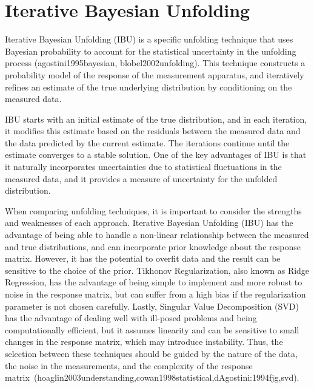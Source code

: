 \clearpage
\section{Iterative Bayesian Unfolding}
    
    Iterative Bayesian Unfolding (IBU) is a specific unfolding technique that uses Bayesian probability to account for the statistical uncertainty in the unfolding process (agostini1995bayesian, blobel2002unfolding). This technique constructs a probability model of the response of the measurement apparatus, and iteratively refines an estimate of the true underlying distribution by conditioning on the measured data.
    
    IBU starts with an initial estimate of the true distribution, and in each iteration, it modifies this estimate based on the residuals between the measured data and the data predicted by the current estimate. The iterations continue until the estimate converges to a stable solution. One of the key advantages of IBU is that it naturally incorporates uncertainties due to statistical fluctuations in the measured data, and it provides a measure of uncertainty for the unfolded distribution.
    
    When comparing unfolding techniques, it is important to consider the strengths and weaknesses of each approach. Iterative Bayesian Unfolding (IBU) has the advantage of being able to handle a non-linear relationship between the measured and true distributions, and can incorporate prior knowledge about the response matrix. However, it has the potential to overfit data and the result can be sensitive to the choice of the prior. Tikhonov Regularization, also known as Ridge Regression, has the advantage of being simple to implement and more robust to noise in the response matrix, but can suffer from a high bias if the regularization parameter is not chosen carefully. Lastly, Singular Value Decomposition (SVD) has the advantage of dealing well with ill-posed problems and being computationally efficient, but it assumes linearity and can be sensitive to small changes in the response matrix, which may introduce instability. Thus, the selection between these techniques should be guided by the nature of the data, the noise in the measurements, and the complexity of the response matrix~(hoaglin2003understanding,cowan1998statistical,dAgostini:1994fjg,svd).
    
